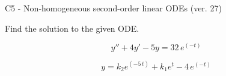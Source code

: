 \begin{exercise}
  \begin{exerciseTitle}C5 - Non-homogeneous second-order linear ODEs (ver. 27)\end{exerciseTitle}
  \begin{exerciseStatement}
    
Find the solution to the given ODE.

    
\[y''+4y'-5y = 32 \, e^{\left(-t\right)}\]

  \end{exerciseStatement}
  \begin{exerciseAnswer}
    
\[y= k_{2} e^{\left(-5 \, t\right)} + k_{1} e^{t} - 4 \, e^{\left(-t\right)}\]

  \end{exerciseAnswer}
\end{exercise}